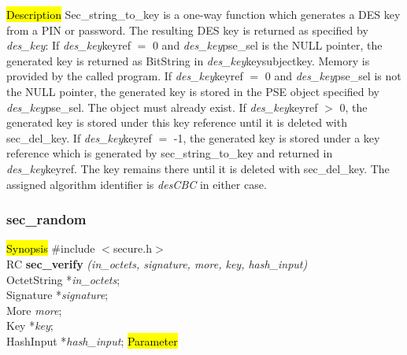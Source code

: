 
\hl{Description}
Sec\_string\_to\_key is a one-way function which generates a DES key from a PIN or password.
The resulting DES key is returned as specified by {\em des\_key}:
\be
\m If {\em des\_key}\pf keyref $=$ 0 and {\em des\_key}\pf pse\_sel is the NULL pointer, the generated key is
   returned as BitString in {\em des\_key}\pf key\pf subjectkey. Memory is provided by the called program. 
\m If {\em des\_key}\pf keyref $=$ 0 and {\em des\_key}\pf pse\_sel is not the NULL pointer, the generated key
   is stored in the PSE object specified by {\em des\_key}\pf pse\_sel. The object must already exist. 
\m If {\em des\_key}\pf keyref $>$ 0, the generated key is stored under this key reference until it is
   deleted with sec\_del\_key.
\m If {\em des\_key}\pf keyref $=$ -1, the generated key is stored under a key reference which is generated 
   by sec\_string\_to\_key and returned in {\em des\_key}\pf keyref. The key remains there until it is deleted
   with sec\_del\_key.
\ee
The assigned algorithm identifier is {\em desCBC} in either case.

\subsubsection{sec\_random}
\label{sec_verify}
\hl{Synopsis}
\#include $<$secure.h$>$ \\ [0.5cm]
RC {\bf sec\_verify} {\em (in\_octets, signature, more, key, hash\_input)} \\
OctetString *{\em in\_octets}; \\
Signature *{\em signature}; \\
More {\em more}; \\
Key *{\em key}; \\
HashInput *{\em hash\_input};
\hl{Parameter}




